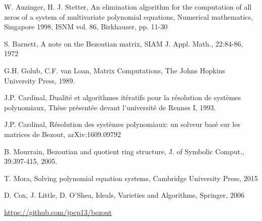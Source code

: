 \documentclass{standalone}
\begin{document}
  \begin{thebibliography}{00}

  {W. Auzinger, H. J. Stetter},
  {An elimination algorithm for the computation of all zeros of a system of multivariate polynomial equations},
  {Numerical mathematics, Singapore 1998, ISNM vol. 86, Birkhauser, pp. 11-30}

  {S. Barnett}, {A note on the Bezoutian matrix},
  {SIAM J. Appl. Math., 22:84-86}, {1972}

  {G.H. Golub, C.F. van Loan},
  {Matrix Computations}, {The Johns Hopkins University Press}, {1989}.

  {J.P. Cardinal}, 
  {Dualit\'e et algorithmes it\'eratifs pour la r\'esolution de syst\`emes polynomiaux}, 
  {Th\`ese pr\'esent\'ee devant l'universit\'e de Rennes I}, {1993}.

  {J.P. Cardinal}, 
  {R\'esolution des syst\`emes polynomiaux: un solveur bas\'e sur les matrices de Bezout},
  {arXiv:1609.09792}
 	
  {B. Mourrain}, {Bezoutian and quotient ring structure},
  {J. of Symbolic Comput., 39:397-415}, {2005}.

  {T. Mora}, {Solving polynomial equation systems}, {Cambridge University Press}, {2015}

  {D. Cox, J. Little, D. O'Shea},
  {Ideals, Varieties and Algorithms}, {Springer}, {2006}

  \url{https://github.com/jpcp13/bezout}

  \end{thebibliography}
\end{document}
